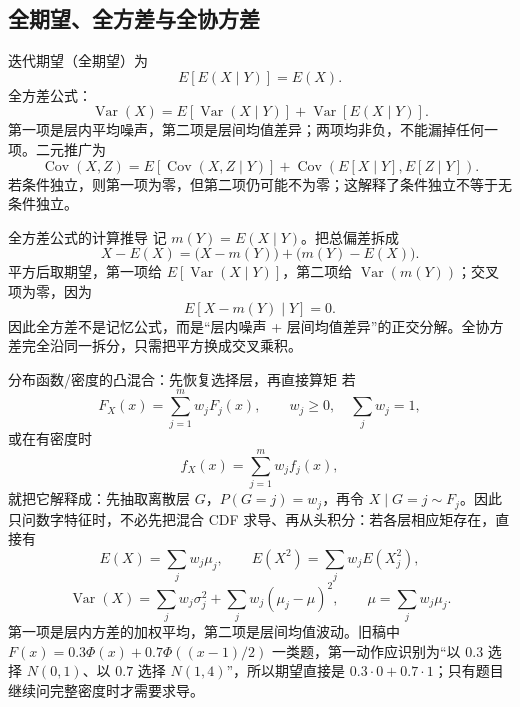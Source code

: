 \documentclass[11pt,a4paper]{ctexart}
\newenvironment{handbookdiagram}{\par\vspace{0.4em}\noindent\begin{center}}{\end{center}\vspace{0.4em}}
\begin{document}
\subsection{全期望、全方差与全协方差}

迭代期望（全期望）为
\[
\boxed{E[E(X\mid Y)]=E(X)}.
\]
全方差公式：
\[
\boxed{\operatorname{Var}(X)=E[\operatorname{Var}(X\mid Y)]+\operatorname{Var}[E(X\mid Y)]}.
\]
第一项是层内平均噪声，第二项是层间均值差异；两项均非负，不能漏掉任何一项。二元推广为
\[
\boxed{\operatorname{Cov}(X,Z)=E[\operatorname{Cov}(X,Z\mid Y)]+\operatorname{Cov}(E[X\mid Y],E[Z\mid Y])}.
\]
若条件独立，则第一项为零，但第二项仍可能不为零；这解释了条件独立不等于无条件独立。

\begin{methodbox}{全方差公式的计算推导}
记 $m(Y)=E(X\mid Y)$。把总偏差拆成
\[
X-E(X)=\bigl(X-m(Y)\bigr)+\bigl(m(Y)-E(X)\bigr).
\]
平方后取期望，第一项给 $E[\operatorname{Var}(X\mid Y)]$，第二项给 $\operatorname{Var}(m(Y))$；交叉项为零，因为
\[
E[X-m(Y)\mid Y]=0.
\]
因此全方差不是记忆公式，而是“层内噪声 + 层间均值差异”的正交分解。全协方差完全沿同一拆分，只需把平方换成交叉乘积。
\end{methodbox}

\begin{handbookdiagram}
\resizebox{0.92\linewidth}{!}{%
%
}
\end{handbookdiagram}

\begin{methodbox}{分布函数/密度的凸混合：先恢复选择层，再直接算矩}
若
\[
F_X(x)=\sum_{j=1}^m w_jF_j(x),\qquad w_j\ge0,\quad \sum_jw_j=1,
\]
或在有密度时
\[
f_X(x)=\sum_{j=1}^m w_jf_j(x),
\]
就把它解释成：先抽取离散层 $G$，$P(G=j)=w_j$，再令 $X\mid G=j\sim F_j$。因此只问数字特征时，不必先把混合 CDF 求导、再从头积分：若各层相应矩存在，直接有
\[
E(X)=\sum_jw_j\mu_j,
\qquad
E(X^2)=\sum_jw_jE(X_j^2),
\]
\[
\operatorname{Var}(X)=\sum_jw_j\sigma_j^2
+\sum_jw_j(\mu_j-\mu)^2,
\qquad \mu=\sum_jw_j\mu_j.
\]
第一项是层内方差的加权平均，第二项是层间均值波动。旧稿中
$F(x)=0.3\Phi(x)+0.7\Phi((x-1)/2)$ 一类题，第一动作应识别为“以 $0.3$ 选择 $N(0,1)$、以 $0.7$ 选择 $N(1,4)$”，所以期望直接是 $0.3\cdot0+0.7\cdot1$；只有题目继续问完整密度时才需要求导。
\end{methodbox}
\end{document}
